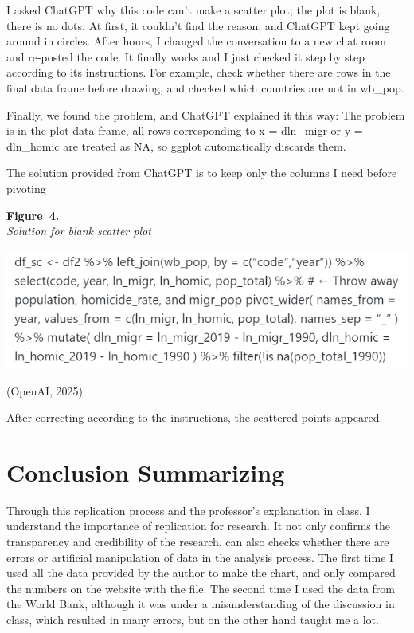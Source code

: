 \documentclass[
  jou,
  floatsintext,
  longtable,
  nolmodern,
  notxfonts,
  notimes,
  colorlinks=true,linkcolor=blue,citecolor=blue,urlcolor=blue]{apa7}
\begin{document}
I asked ChatGPT why this code can't make a scatter plot; the plot is
blank, there is no dots. At first, it couldn't find the reason, and
ChatGPT kept going around in circles. After hours, I changed the
conversation to a new chat room and re-posted the code. It finally works
and I just checked it step by step according to its instructions. For
example, check whether there are rows in the final data frame before
drawing, and checked which countries are not in wb\_pop.

Finally, we found the problem, and ChatGPT explained it this way: The
problem is in the plot data frame, all rows corresponding to x =
dln\_migr or y = dln\_homic are treated as NA, so ggplot automatically
discards them.

The solution provided from ChatGPT is to keep only the columns I need
before pivoting

\label{fig:S1}
\textbf{Figure~4.}\\
\emph{Solution for blank scatter plot}

\begin{center}
\includegraphics[width=0.8\linewidth,height=\textheight,keepaspectratio]{fig/S1.png}
\end{center}

(OpenAI, 2025)

After correcting according to the instructions, the scattered points
appeared.

\section{Conclusion Summarizing}\label{conclusion-summarizing}

Through this replication process and the professor's explanation in
class, I understand the importance of replication for research. It not
only confirms the transparency and credibility of the research, can also
checks whether there are errors or artificial manipulation of data in
the analysis process. The first time I used all the data provided by the
author to make the chart, and only compared the numbers on the website
with the file. The second time I used the data from the World Bank,
although it was under a misunderstanding of the discussion in class,
which resulted in many errors, but on the other hand taught me a lot.
\end{document}
